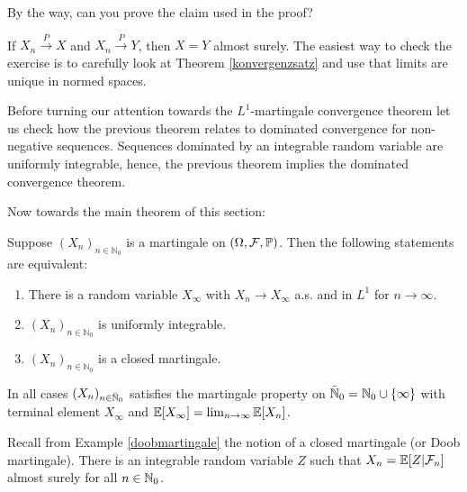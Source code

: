 By the way, can you prove the claim used in the proof?
	\begin{luebung}
		If $X_n\overset{P}{\to}X$ and $X_n\overset{P}{\to}Y$, then $X=Y$ almost surely.  	The easiest way to check the exercise is to carefully look at Theorem \ref{konvergenzsatz} and use that limits are unique in normed spaces.
	\end{luebung}
	
Before turning our attention towards the $L^1$-martingale convergence theorem let us check how the previous theorem relates to dominated convergence for non-negative sequences. Sequences dominated by an integrable random variable are uniformly integrable, hence, the previous theorem implies the dominated convergence theorem.\smallskip

	\marginpar{\textcolor{red}{Lecture 9}}

Now towards the main theorem of this section:
\begin{lsuperwichtigersatz}
\begin{theorem}\label{L1_convergence}
	Suppose $(X_n)_{n\in\mathbb{N}_0}$ is a martingale on $(\Omega, \mathcal F, \P)$. Then the following statements are equivalent:
	\begin{enumerate}[label=(\roman*)]
		\item
			There is a random variable $X_\infty$ with $X_n \to X_{\infty}$ a.s. and in $L^1$ for $n\to\infty$.
		\item
			$(X_n)_{n\in\mathbb{N}_0}$ is uniformly integrable.
		\item
			$(X_n)_{n\in\mathbb{N}_0}$ is a closed martingale.
	\end{enumerate}
	In all cases $(X_n)_{n\in \bar\N_0}$ satisfies the martingale property on $\bar \N_0=\N_0\cup \{\infty\}$ with terminal element $X_\infty$ and $\E[X_\infty]=\lim_{n\to\infty}\E[X_n]$.
\end{theorem}
\end{lsuperwichtigersatz}
Recall from Example \ref{doobmartingale} the notion of a closed martingale (or Doob martingale). There is an integrable random variable $Z$ such that $X_n=\E[Z|\mathcal F_n]$ almost surely for all $n\in \N_0$.

